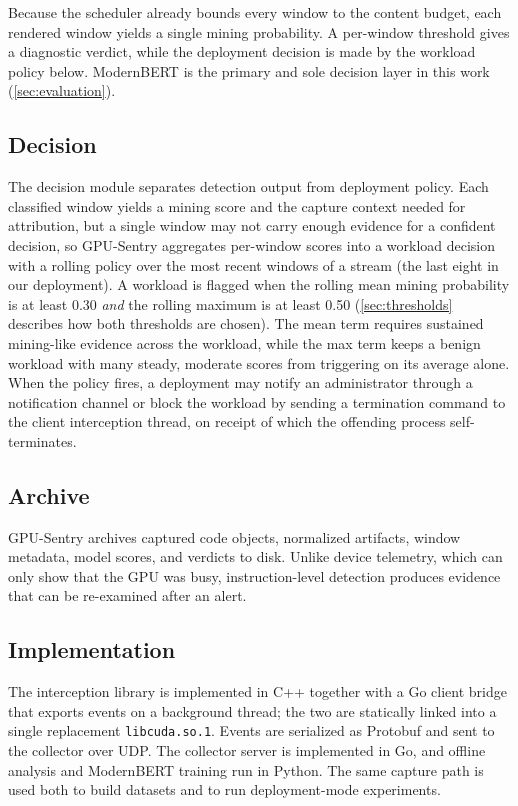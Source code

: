 Because the scheduler already bounds every window to the content budget, each rendered window yields a single mining probability. A per-window threshold gives a diagnostic verdict, while the deployment decision is made by the workload policy below. ModernBERT is the primary and sole decision layer in this work (\cref{sec:evaluation}).

\subsection{Decision}
\label{sec:decision}

The decision module separates detection output from deployment policy. Each classified window yields a mining score and the capture context needed for attribution, but a single window may not carry enough evidence for a confident decision, so GPU-Sentry aggregates per-window scores into a workload decision with a rolling policy over the most recent windows of a stream (the last eight in our deployment). A workload is flagged when the rolling mean mining probability is at least 0.30 \emph{and} the rolling maximum is at least 0.50 (\cref{sec:thresholds} describes how both thresholds are chosen). The mean term requires sustained mining-like evidence across the workload, while the max term keeps a benign workload with many steady, moderate scores from triggering on its average alone. When the policy fires, a deployment may notify an administrator through a notification channel or block the workload by sending a termination command to the client interception thread, on receipt of which the offending process self-terminates.

\subsection{Archive}
\label{sec:archive}

GPU-Sentry archives captured code objects, normalized artifacts, window metadata, model scores, and verdicts to disk. Unlike device telemetry, which can only show that the GPU was busy, instruction-level detection produces evidence that can be re-examined after an alert.

\subsection{Implementation}
\label{sec:implementation}

The interception library is implemented in C++ together with a Go client bridge that exports events on a background thread; the two are statically linked into a single replacement \texttt{libcuda.so.1}. Events are serialized as Protobuf and sent to the collector over UDP. The collector server is implemented in Go, and offline analysis and ModernBERT training run in Python. The same capture path is used both to build datasets and to run deployment-mode experiments.

